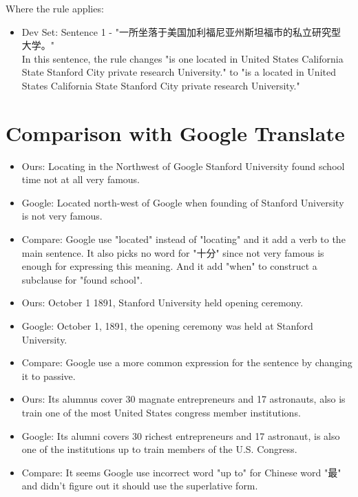 \documentclass[11pt]{article} %
\begin{document}
\begin{CJK}{UTF8}{gbsn}
Where the rule applies:
\begin{itemize}
\item Dev Set: Sentence 1 - "一所坐落于美国加利福尼亚州斯坦福市的私立研究型 大学。"\\
In this sentence, the rule changes "is one located in United States California State Stanford City private research University." to "is a located in United States California State Stanford City private research University."
\end{itemize}

\section{Comparison with Google Translate}

\begin{itemize}
\item Ours: Locating in the Northwest of Google Stanford University found school time not at all very famous.
\item Google: Located north-west of Google when founding of Stanford University is not very famous. 
\item Compare: Google use "located" instead of "locating" and it add a verb to the main sentence. It also picks no word for "十分" since not very famous is enough for expressing this meaning. And it add "when" to construct a subclause for "found school". 
\end{itemize}
\begin{itemize}
\item Ours: October 1 1891, Stanford University held opening ceremony.
\item Google: October 1, 1891, the opening ceremony was held at Stanford University. 
\item Compare: Google use a more common expression for the sentence by changing it to passive.
\end{itemize}
\begin{itemize}
\item Ours: Its alumnus cover 30 magnate entrepreneurs and 17 astronauts, also is train one of the most United States congress member institutions.
\item Google: Its alumni covers 30 richest entrepreneurs and 17 astronaut, is also one of the institutions up to train members of the U.S. Congress. 
\item Compare: It seems Google use incorrect word "up to" for Chinese word "最" and didn't figure out it should use the superlative form.

\end{itemize}
\end{CJK}
\end{document}
